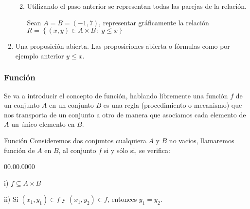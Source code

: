 \begin{enumerate}
\begin{enumerate}
\begin{center}
\end{center}
\item Utilizando el paso anterior se representan todas las parejas de la
relación.\begin{ejem}{} Sean $A=B=(-1,7)$, representar gráficamente
la relación $R=\left\{ \left(x,y\right)\in A\times B\,:\: y\leq x\right\} $
\end{ejem}
\end{enumerate}
\item Una proposición abierta. Las proposiciones abierta o fórmulas como
por ejemplo anterior $y\leq x.$
\end{enumerate}

\subsubsection{Función}

Se va a introducir el concepto de función, hablando libremente una
función $f$ de un conjunto $A$ en un conjunto $B$ es una regla
(procedimiento o mecanismo) que nos transporta de un conjunto a otro
de manera que asociamos cada elemento de $A$ un único elemento en
$B.$ 

\begin{definicionn}{Función} Consideremos dos conjuntos cualquiera
$A$ y $B$ no vacíos, llamaremos función de $A$ en $B$, al conjunto
$f$ si y sólo si, se verifica: 
\begin{lyxlist}{00.00.0000}
\item [{i)}] $f\subseteq A\times B$
\item [{ii)}] Si $\left(x_{1},y_{1}\right)\in f$ y $\left(x_{1},y_{2}\right)\in f$,
entonces $y_{1}=y_{2}.$
\end{lyxlist}
\end{definicionn}

